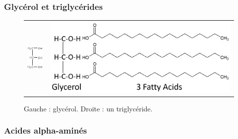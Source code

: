 \documentclass[11pt,a4paper]{report}
\begin{document}
\subsubsection*{Glycérol et triglycérides}
\begin{figure}[h!]
	\begin{center}
		\begin{tabular}{cc}
  		\includegraphics[scale = 1]{glycerol.png} &
   		\includegraphics[scale = 0.4]{triglycerides.png}\\
	\end{tabular}
	\caption{Gauche : glycérol. Droite : un triglycéride.}
	\end{center}
\end{figure}

\subsubsection*{Acides alpha-aminés}
\end{document}
